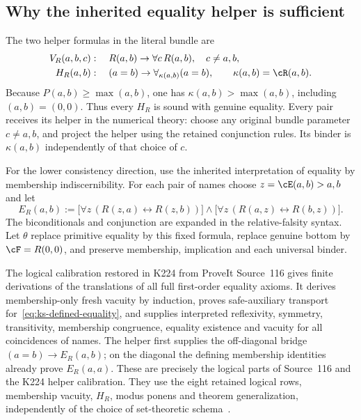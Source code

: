 \subsection{Why the inherited equality helper is sufficient}
\label{sec:ks-equality}

The two helper formulas in the literal bundle are
\begin{align*}
 V_R(a,b,c)&:\quad R(a,b)\to\forall c\,R(a,b),\quad c\ne a,b,\\
 H_R(a,b)&:\quad (a=b)\to
                    \forall_{\kappa(a,b)}(a=b),
 \qquad \kappa(a,b)=\cR(a,b).
\end{align*}
Because $P(a,b)\ge\max(a,b)$, one has
$\kappa(a,b)>\max(a,b)$, including $(a,b)=(0,0)$.
Thus every $H_R$ is sound with genuine equality.  Every pair receives
its helper in the numerical theory: choose any original bundle parameter
$c\ne a,b$, and project the helper using the retained conjunction rules.
Its binder is $\kappa(a,b)$ independently of that choice of $c$.

For the lower consistency direction, use the inherited interpretation of
equality by membership indiscernibility.  For each pair of names choose
$z=\cE(a,b)>a,b$ and let
\begin{equation}
 E_{\!R}(a,b):=
 \bigl[\forall z\,(R(z,a)\leftrightarrow R(z,b))\bigr]\land
 \bigl[\forall z\,(R(a,z)\leftrightarrow R(b,z))\bigr].
 \label{eq:ks-defined-equality}
\end{equation}
The biconditionals and conjunction are expanded in the relative-falsity
syntax.  Let $\theta$ replace primitive equality by this fixed formula,
replace genuine bottom by $\cF=R(0,0)$, and preserve membership,
implication and each universal binder.

The logical calibration restored in K224 from ProveIt Source~116 gives
finite derivations of the translations of all full first-order equality
axioms.  It derives membership-only fresh vacuity by induction, proves
safe-auxiliary transport for~\eqref{eq:ks-defined-equality}, and supplies
interpreted reflexivity, symmetry, transitivity, membership congruence,
equality existence and vacuity for all coincidences of names.  The
helper first supplies the off-diagonal bridge
$(a=b)\to E_{\!R}(a,b)$; on the diagonal the defining membership
identities already prove $E_{\!R}(a,a)$.  These are precisely the logical
parts of Source~116 and the K224 helper calibration.  They use the eight
retained logical rows, membership vacuity, $H_R$, modus ponens and
theorem generalization, independently of the choice of set-theoretic
schema~\cite{source116,k224}.

